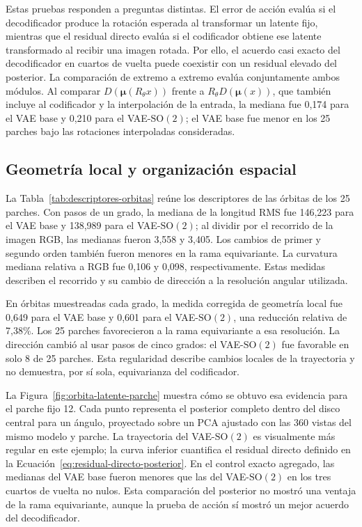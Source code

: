 \begin{samepage}
Estas pruebas responden a preguntas distintas. El error de acción evalúa si
el decodificador produce la rotación esperada al transformar un latente fijo,
mientras que el residual directo evalúa si el codificador obtiene ese latente
transformado al recibir una imagen rotada. Por ello, el acuerdo casi exacto del
decodificador en cuartos de vuelta puede coexistir con un residual elevado del
posterior. La comparación de extremo a extremo evalúa conjuntamente ambos módulos. Al
comparar
\(D(\boldsymbol{\mu}(R_\theta x))\) frente a
\(R_\theta D(\boldsymbol{\mu}(x))\), que también incluye al codificador y la
interpolación de la entrada, la mediana fue 0,174 para el VAE base y 0,210 para
el VAE-\(\mathrm{SO}(2)\); el VAE base fue menor en los 25 parches bajo las
rotaciones interpoladas consideradas.
\par
\end{samepage}

\FloatBarrier

\subsection{Geometría local y organización espacial}

La Tabla~\ref{tab:descriptores-orbitas} reúne los descriptores de las órbitas
de los 25 parches. Con pasos de un grado, la mediana de la longitud RMS fue
146,223 para el VAE base y 138,989 para el VAE-\(\mathrm{SO}(2)\); al
dividir por el recorrido de la imagen RGB, las medianas fueron 3,558 y 3,405.
Los cambios de primer y segundo orden también fueron menores en la rama
equivariante. La curvatura mediana relativa a RGB fue 0,106 y 0,098,
respectivamente. Estas medidas describen el recorrido y su cambio de dirección
a la resolución angular utilizada.



En órbitas muestreadas cada grado, la medida corregida de geometría local fue
0,649 para el VAE base y 0,601 para el VAE-\(\mathrm{SO}(2)\), una reducción
relativa de 7,38\%. Los 25 parches favorecieron a la rama equivariante a esa
resolución. La dirección cambió al usar pasos de cinco grados: el VAE-\(\mathrm{SO}(2)\)
fue favorable en solo 8 de 25 parches. Esta regularidad describe cambios locales
de la trayectoria y no demuestra, por sí sola, equivarianza del codificador.

La Figura~\ref{fig:orbita-latente-parche} muestra cómo se obtuvo esa evidencia
para el parche fijo 12. Cada punto representa el posterior completo dentro del
disco central para un ángulo, proyectado sobre un PCA ajustado con las 360
vistas del mismo modelo y parche. La trayectoria del VAE-\(\mathrm{SO}(2)\) es
visualmente más regular en este ejemplo; la curva inferior cuantifica el
residual directo definido en la Ecuación~\eqref{eq:residual-directo-posterior}.
En el control exacto agregado, las medianas del VAE base fueron menores que
las del VAE-\(\mathrm{SO}(2)\) en los tres cuartos de vuelta no nulos. Esta
comparación del posterior no mostró una ventaja de la rama equivariante,
aunque la prueba de acción sí mostró un mejor acuerdo del decodificador.

